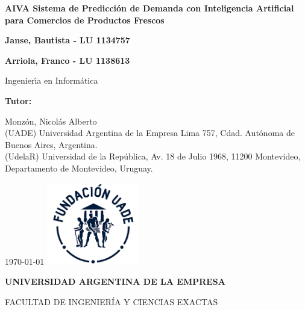 \begin{titlepage} %

    \centering
    {\textbf{\fontsize{16}{17}\selectfont  AIVA Sistema de Predicción de Demanda con Inteligencia Artificial para Comercios de Productos Frescos} \par}
    \vspace{1cm}
    {\textbf{\fontsize{16}{17}\selectfont Janse, Bautista - LU 1134757} \par}
    {\textbf{\fontsize{16}{17}\selectfont Arriola, Franco - LU 1138613} \par}
    \vspace{1.5cm}
    {\fontsize{16}{17}\selectfont Ingenier\'{\i}a en Inform\'atica \par}
    \vspace{1cm}
    {\textbf{\fontsize{14}{14}\selectfont Tutor:} \par}
    {\fontsize{14}{14}\selectfont Monzón, Nicolás Alberto
        \\ (UADE) Universidad Argentina de la Empresa Lima 757, Cdad. Autónoma de Buenos Aires, Argentina.
        \\ (UdelaR) Universidad de la República, Av. 18 de Julio 1968, 11200 Montevideo, Departamento de Montevideo, Uruguay.
        \par}
    \vspace{1cm}
    \vfill
    \today
    \vfill
    \includegraphics[width=0.30\textwidth]{./images/UADE}\par \vspace{1cm}
    {\textbf{\fontsize{14}{14}\selectfont UNIVERSIDAD ARGENTINA DE LA EMPRESA} \par}
    {\fontsize{14}{14}\selectfont FACULTAD DE INGENIER\'IA Y CIENCIAS EXACTAS \par}

\end{titlepage}
